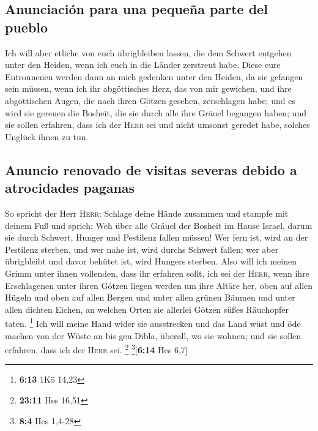 \hypertarget{anunciaciuxf3n-para-una-pequeuxf1a-parte-del-pueblo}{%
\subsection{Anunciación para una pequeña parte del
pueblo}\label{anunciaciuxf3n-para-una-pequeuxf1a-parte-del-pueblo}}

 Ich will aber etliche von euch übrigbleiben lassen, die
dem Schwert entgehen unter den Heiden, wenn ich euch in die Länder
zerstreut habe.  Diese eure Entronnenen werden dann an
mich gedenken unter den Heiden, da sie gefangen sein müssen, wenn ich
ihr abgöttisches Herz, das von mir gewichen, und ihre abgöttischen
Augen, die nach ihren Götzen gesehen, zerschlagen habe; und es wird sie
gereuen die Bosheit, die sie durch alle ihre Gräuel begangen haben;
 und sie sollen erfahren, dass ich der \textsc{Herr} sei
und nicht umsonst geredet habe, solches Unglück ihnen zu tun.

\hypertarget{anuncio-renovado-de-visitas-severas-debido-a-atrocidades-paganas}{%
\subsection{Anuncio renovado de visitas severas debido a atrocidades
paganas}\label{anuncio-renovado-de-visitas-severas-debido-a-atrocidades-paganas}}

 So spricht der Herr \textsc{Herr}: Schlage deine Hände
zusammen und stampfe mit deinem Fuß und sprich: Weh über alle Gräuel der
Bosheit im Hause Israel, darum sie durch Schwert, Hunger und Pestilenz
fallen müssen!  Wer fern ist, wird an der Pestilenz
sterben, und wer nahe ist, wird durchs Schwert fallen; wer aber
übrigbleibt und davor behütet ist, wird Hungers sterben. Also will ich
meinen Grimm unter ihnen vollenden,  dass ihr erfahren
sollt, ich sei der \textsc{Herr}, wenn ihre Erschlagenen unter ihren
Götzen liegen werden um ihre Altäre her, oben auf allen Hügeln und oben
auf allen Bergen und unter allen grünen Bäumen und unter allen dichten
Eichen, an welchen Orten sie allerlei Götzen süßes Räuchopfer taten.
\footnote{\textbf{6:13} 1Kö 14,23}  Ich will meine Hand
wider sie ausstrecken und das Land wüst und öde machen von der Wüste an
bis gen Dibla, überall, wo sie wohnen; und sie sollen erfahren, dass ich
der \textsc{Herr} sei. \footnote{\textbf{23:11} Hes 16,51}
\footnote{\textbf{8:4} Hes 1,4-28}{[}\textbf{6:14} Hes 6,7{]}

